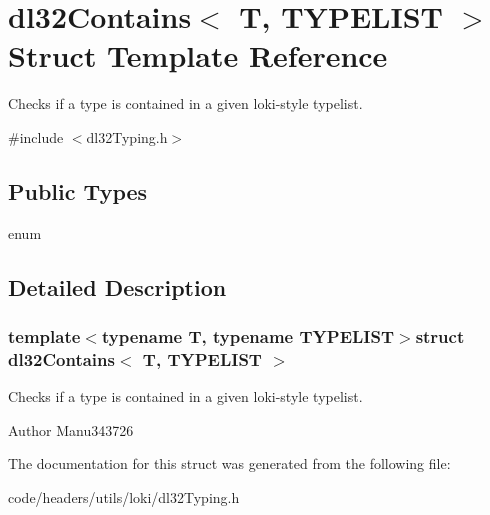 \hypertarget{structdl32_contains}{\section{dl32\-Contains$<$ T, T\-Y\-P\-E\-L\-I\-S\-T $>$ Struct Template Reference}
\label{structdl32_contains}
}


Checks if a type is contained in a given loki-\/style typelist.  




{\ttfamily \#include $<$dl32\-Typing.\-h$>$}

\subsection*{Public Types}
\begin{DoxyCompactItemize}
\item 
enum 
\end{DoxyCompactItemize}


\subsection{Detailed Description}
\subsubsection*{template$<$typename T, typename T\-Y\-P\-E\-L\-I\-S\-T$>$struct dl32\-Contains$<$ T, T\-Y\-P\-E\-L\-I\-S\-T $>$}

Checks if a type is contained in a given loki-\/style typelist. 

\begin{DoxyAuthor}{Author}
Manu343726 
\end{DoxyAuthor}


The documentation for this struct was generated from the following file\-:\begin{DoxyCompactItemize}
\item 
code/headers/utils/loki/dl32\-Typing.\-h\end{DoxyCompactItemize}
